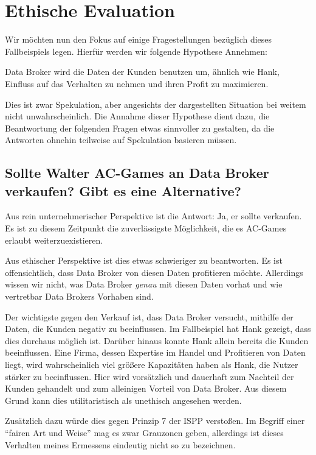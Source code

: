 \section{Ethische Evaluation}

Wir möchten nun den Fokus auf einige Fragestellungen bezüglich dieses Fallbeispiels legen. Hierfür werden wir folgende Hypothese Annehmen:

\begin{center}
\parbox{0.8\textwidth}{
    Data Broker wird die Daten der Kunden benutzen um, ähnlich wie Hank, Einfluss auf das Verhalten zu nehmen und ihren Profit zu maximieren. 
}
\end{center}

Dies ist zwar Spekulation, aber angesichts der dargestellten Situation bei weitem nicht unwahrscheinlich.
Die Annahme dieser Hypothese dient dazu, die Beantwortung der folgenden Fragen etwas sinnvoller zu gestalten, da die Antworten ohnehin teilweise auf Spekulation basieren müssen.

\subsection{Sollte Walter AC-Games an Data Broker verkaufen? \cite{kees_faites_2017} Gibt es eine Alternative?}

Aus rein unternehmerischer Perspektive ist die Antwort: Ja, er sollte verkaufen.
Es ist zu diesem Zeitpunkt die zuverlässigste Möglichkeit, die es AC-Games erlaubt weiterzuexistieren.

Aus ethischer Perspektive ist dies etwas schwieriger zu beantworten.
Es ist offensichtlich, dass Data Broker von diesen Daten profitieren möchte.
Allerdings wissen wir nicht, was Data Broker \emph{genau} mit diesen Daten vorhat und wie vertretbar Data Brokers Vorhaben sind.

Der wichtigste gegen den Verkauf ist, dass Data Broker versucht, mithilfe der Daten, die Kunden negativ zu beeinflussen. 
Im Fallbeispiel hat Hank gezeigt, dass dies durchaus möglich ist.
Darüber hinaus konnte Hank allein bereits die Kunden beeinflussen.
Eine Firma, dessen Expertise im Handel und Profitieren von Daten liegt, wird wahrscheinlich viel größere Kapazitäten haben als Hank, die Nutzer stärker zu beeinflussen.
Hier wird vorsätzlich und dauerhaft zum Nachteil der Kunden gehandelt und zum alleinigen Vorteil von Data Broker. Aus diesem Grund kann dies utilitaristisch als unethisch angesehen werden.

Zusätzlich dazu würde dies gegen Prinzip 7 der ISPP verstoßen. Im Begriff einer \enquote{fairen Art und Weise} mag es zwar Grauzonen geben, allerdings ist dieses Verhalten meines Ermessens eindeutig nicht so zu bezeichnen.  



